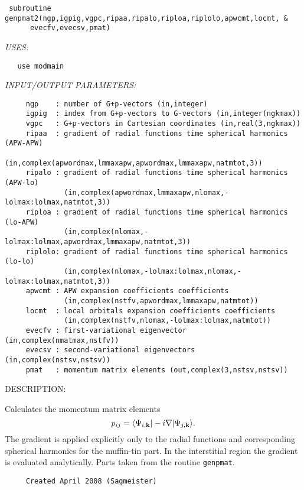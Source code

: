\documentclass[11pt]{article}
\begin{document}
\begin{verbatim} subroutine genpmat2(ngp,igpig,vgpc,ripaa,ripalo,riploa,riplolo,apwcmt,locmt, &
      evecfv,evecsv,pmat)\end{verbatim}{\em USES:}
\begin{verbatim}   use modmain\end{verbatim}{\em INPUT/OUTPUT PARAMETERS:}
\begin{verbatim}     ngp    : number of G+p-vectors (in,integer)
     igpig  : index from G+p-vectors to G-vectors (in,integer(ngkmax))
     vgpc   : G+p-vectors in Cartesian coordinates (in,real(3,ngkmax))
     ripaa  : gradient of radial functions time spherical harmonics (APW-APW)
              (in,complex(apwordmax,lmmaxapw,apwordmax,lmmaxapw,natmtot,3))
     ripalo : gradient of radial functions time spherical harmonics (APW-lo)
              (in,complex(apwordmax,lmmaxapw,nlomax,-lolmax:lolmax,natmtot,3))
     riploa : gradient of radial functions time spherical harmonics (lo-APW)
              (in,complex(nlomax,-lolmax:lolmax,apwordmax,lmmaxapw,natmtot,3))
     riplolo: gradient of radial functions time spherical harmonics (lo-lo)
              (in,complex(nlomax,-lolmax:lolmax,nlomax,-lolmax:lolmax,natmtot,3))
     apwcmt : APW expansion coefficients coefficients
              (in,complex(nstfv,apwordmax,lmmaxapw,natmtot))
     locmt  : local orbitals expansion coefficients coefficients
              (in,complex(nstfv,nlomax,-lolmax:lolmax,natmtot))
     evecfv : first-variational eigenvector (in,complex(nmatmax,nstfv))
     evecsv : second-variational eigenvectors (in,complex(nstsv,nstsv))
     pmat   : momentum matrix elements (out,complex(3,nstsv,nstsv))\end{verbatim}
{\sf DESCRIPTION:\\ }


     Calculates the momentum matrix elements
     $$ p_{ij}=\langle\Psi_{i,{\bf k}}|-i\nabla|\Psi_{j,{\bf k}}\rangle. $$
     The gradient is applied explicitly only to the radial functions and 
     corresponding spherical harmonics for the muffin-tin part. In the 
     interstitial region the gradient is evaluated analytically.
     Parts taken from the routine {\tt genpmat}.
  
\begin{verbatim}     Created April 2008 (Sagmeister)\end{verbatim}

\end{document}
